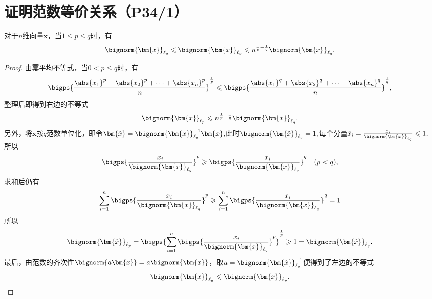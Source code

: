 \documentclass{homework}
\begin{document}
\section{证明范数等价关系（P34/1）}
    对于$n$维向量$\bm{x}$，当$1\leqslant p\leqslant q$时，有$$\bignorm{\bm{x}}_{\ell_q}\leqslant\bignorm{\bm{x}}_{\ell_p}\leqslant n^{\frac{1}{p}-\frac{1}{q}}\bignorm{\bm{x}}_{\ell_q}.$$
    \begin{proof}
    由幂平均不等式，当$0<p\leqslant q$时，有$$\bigps{\frac{\abs{x_1}^p+\abs{x_2}^p+\cdots+\abs{x_n}^p}{n}}^{\frac{1}{p}}\leqslant\bigps{\frac{\abs{x_1}^q+\abs{x_2}^q+\cdots+\abs{x_n}^q}{n}}^{\frac{1}{q}},$$整理后即得到右边的不等式$$\bignorm{\bm{x}}_{\ell_p}\leqslant n^{\frac{1}{p}-\frac{1}{q}}\bignorm{\bm{x}}_{\ell_q}.$$
    另外，将$\bm{x}$按$q$范数单位化，即令$\bm{\hat{x}}=\bignorm{\bm{x}}_{\ell_q}^{-1}\bm{x},$此时$\bignorm{\bm{\hat{x}}}_{\ell_q}=1,$每个分量$\hat{x}_i=\frac{x_i}{\bignorm{\bm{x}}_{\ell_q}}\leqslant 1,$所以$$\bigps{\frac{x_i}{\bignorm{\bm{x}}_{\ell_q}}}^p\geqslant\bigps{\frac{x_i}{\bignorm{\bm{x}}_{\ell_q}}}^q\quad(p<q),$$求和后仍有$$\sum_{i=1}^n\bigps{\frac{x_i}{\bignorm{\bm{x}}_{\ell_q}}}^p\geqslant\sum_{i=1}^n\bigps{\frac{x_i}{\bignorm{\bm{x}}_{\ell_q}}}^q=1$$所以$$\bignorm{\bm{\hat{x}}}_{\ell_p}=\bigps{\sum_{i=1}^n\bigps{\frac{x_i}{\bignorm{\bm{x}}_{\ell_q}}}^p}^{\frac{1}{p}}\geqslant 1=\bignorm{\bm{\hat{x}}}_{\ell_q}.$$
    最后，由范数的齐次性$\bignorm{a\bm{x}}=a\bignorm{\bm{x}}$，取$a=\bignorm{\bm{\hat{x}}}_{\ell_q}^{-1}$便得到了左边的不等式$$\bignorm{\bm{x}}_{\ell_q}\leqslant\bignorm{\bm{x}}_{\ell_p}.$$
    \end{proof}
\end{document}
